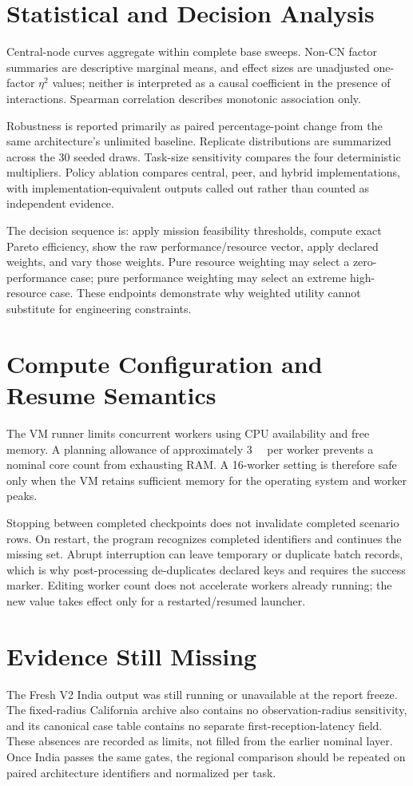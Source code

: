 \section{Statistical and Decision Analysis}

Central-node curves aggregate within complete base sweeps. Non-CN factor summaries are descriptive marginal means, and effect sizes are unadjusted one-factor $\eta^2$ values; neither is interpreted as a causal coefficient in the presence of interactions. Spearman correlation describes monotonic association only.

Robustness is reported primarily as paired percentage-point change from the same architecture's unlimited baseline. Replicate distributions are summarized across the 30 seeded draws. Task-size sensitivity compares the four deterministic multipliers. Policy ablation compares central, peer, and hybrid implementations, with implementation-equivalent outputs called out rather than counted as independent evidence.

The decision sequence is: apply mission feasibility thresholds, compute exact Pareto efficiency, show the raw performance/resource vector, apply declared weights, and vary those weights. Pure resource weighting may select a zero-performance case; pure performance weighting may select an extreme high-resource case. These endpoints demonstrate why weighted utility cannot substitute for engineering constraints.

\section{Compute Configuration and Resume Semantics}

The VM runner limits concurrent workers using CPU availability and free memory. A planning allowance of approximately \SI{3}{\gibi\byte} per worker prevents a nominal core count from exhausting RAM. A 16-worker setting is therefore safe only when the VM retains sufficient memory for the operating system and worker peaks.

Stopping between completed checkpoints does not invalidate completed scenario rows. On restart, the program recognizes completed identifiers and continues the missing set. Abrupt interruption can leave temporary or duplicate batch records, which is why post-processing de-duplicates declared keys and requires the success marker. Editing worker count does not accelerate workers already running; the new value takes effect only for a restarted/resumed launcher.

\section{Evidence Still Missing}

The Fresh V2 India output was still running or unavailable at the report freeze. The fixed-radius California archive also contains no observation-radius sensitivity, and its canonical case table contains no separate first-reception-latency field. These absences are recorded as limits, not filled from the earlier nominal layer. Once India passes the same gates, the regional comparison should be repeated on paired architecture identifiers and normalized per task.
